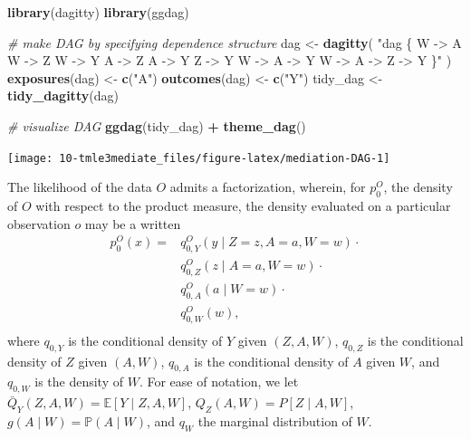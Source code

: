 \documentclass[12pt, krantz2,]{krantz}
\newenvironment{Shaded}{\begin{snugshade}}{\end{snugshade}}
\newcommand{\CommentTok}[1]{\textcolor[rgb]{0.37,0.37,0.37}{\textit{#1}}}
\newcommand{\KeywordTok}[1]{\textcolor[rgb]{0.27,0.27,0.27}{\textbf{#1}}}
\newcommand{\NormalTok}[1]{#1}
\newcommand{\OperatorTok}[1]{\textcolor[rgb]{0.43,0.43,0.43}{\textbf{#1}}}
\newcommand{\StringTok}[1]{\textcolor[rgb]{0.5,0.5,0.5}{#1}}
\theoremstyle{definition}
\theoremstyle{definition}
\theoremstyle{definition}
\renewcommand{\P}{\mathbb{P}}
\newcommand{\E}{\mathbb{E}}
\newcommand{\1}{\mathbbm{1}}
\begin{document}
\begin{Shaded}
\begin{Highlighting}[]
\KeywordTok{library}\NormalTok{(dagitty)}
\KeywordTok{library}\NormalTok{(ggdag)}

\CommentTok{# make DAG by specifying dependence structure}
\NormalTok{dag <-}\StringTok{ }\KeywordTok{dagitty}\NormalTok{(}
  \StringTok{"dag \{}
\StringTok{    W -> A}
\StringTok{    W -> Z}
\StringTok{    W -> Y}
\StringTok{    A -> Z}
\StringTok{    A -> Y}
\StringTok{    Z -> Y}
\StringTok{    W -> A -> Y}
\StringTok{    W -> A -> Z -> Y}
\StringTok{  \}"}
\NormalTok{)}
\KeywordTok{exposures}\NormalTok{(dag) <-}\StringTok{ }\KeywordTok{c}\NormalTok{(}\StringTok{"A"}\NormalTok{)}
\KeywordTok{outcomes}\NormalTok{(dag) <-}\StringTok{ }\KeywordTok{c}\NormalTok{(}\StringTok{"Y"}\NormalTok{)}
\NormalTok{tidy_dag <-}\StringTok{ }\KeywordTok{tidy_dagitty}\NormalTok{(dag)}

\CommentTok{# visualize DAG}
\KeywordTok{ggdag}\NormalTok{(tidy_dag) }\OperatorTok{+}
\StringTok{  }\KeywordTok{theme_dag}\NormalTok{()}
\end{Highlighting}
\end{Shaded}

\begin{center}\texttt{[image: 10-tmle3mediate\_files/figure-latex/mediation-DAG-1]} \end{center}

The likelihood of the data \(O\) admits a factorization, wherein, for \(p_0^O\),
the density of \(O\) with respect to the product measure, the density evaluated
on a particular observation \(o\) may be a written
\begin{align}
  p_0^O(x) = &q^O_{0,Y}(y \mid Z = z, A = a, W = w) \cdot \\
    &q^O_{0,Z}(z \mid A = a, W = w) \cdot \\
    &q^O_{0,A}(a \mid W = w) \cdot \\
    &q^O_{0,W}(w),\\
  \label{eq:likelihood-factorization-mediate}
\end{align}
where \(q_{0, Y}\) is the conditional density of \(Y\) given \((Z, A, W)\), \(q_{0, Z}\)
is the conditional density of \(Z\) given \((A, W)\), \(q_{0, A}\) is the conditional
density of \(A\) given \(W\), and \(q_{0, W}\) is the density of \(W\). For ease of
notation, we let \(\bar{Q}_Y(Z, A, W) = \E[Y \mid Z, A, W]\), \(Q_Z(A, W) = P[Z \mid A, W]\), \(g(A \mid W) = \P(A \mid W)\), and \(q_W\) the marginal
distribution of \(W\).
\end{document}
